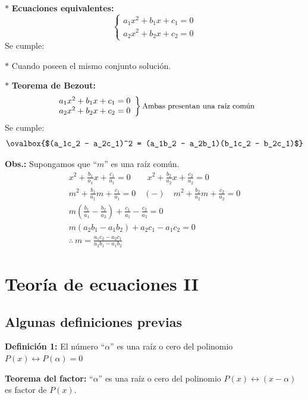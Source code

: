 \documentclass[11pt,a4paper]{article}
\begin{document}
\begin{minipage}[t]{0.436\textwidth}
$\ast$ \textbf{Ecuaciones equivalentes:}
\[
\begin{cases}
a_1x^2 + b_1x + c_1 = 0\\
a_2x^2 + b_2x + c_2 = 0
\end{cases}
\]
Se cumple: \ 

\medskip
$\ast$ Cuando poseen el mismo conjunto solución.
\end{minipage}\hfill
\begin{minipage}[t]{0.533\textwidth}
$\ast$ \textbf{Teorema de Bezout:}
\[
\left.\begin{array}{l}
a_1x^2 + b_1x + c_1 = 0\\
a_2x^2 + b_2x + c_2 = 0
\end{array}\right\}
\text{\small Ambas presentan una raíz común}
\]
Se cumple:
\[\ovalbox{$(a_1c_2 - a_2c_1)^2 = (a_1b_2 - a_2b_1)(b_1c_2 - b_2c_1)$}\]

\textbf{Obs.:} Supongamos que ``$m$'' es una raíz común.
\begin{gather*}
x^2 + \frac{b_1}{a_1}x + \frac{c_1}{a_1} = 0 \qquad x^2 + \frac{b_2}{a_2}x + \frac{c_2}{a_2} = 0\\
m^2 + \frac{b_1}{a_1}m + \frac{c_1}{a_1} = 0 \quad (-) \quad m^2 + \frac{b_2}{a_2}m + \frac{c_2}{a_2} = 0\\
m\left(\frac{b_1}{a_1} - \frac{b_2}{a_2}\right) + \frac{c_1}{a_1} - \frac{c_2}{a_2} = 0\\
m(a_2b_1 - a_1b_2) + a_2c_1 - a_1c_2 = 0\\
\therefore\ m = \frac{a_1c_2 - a_2c_1}{a_2b_1 - a_1b_2}
\end{gather*}
\end{minipage}

\newpage
\section{Teoría de ecuaciones II}

\subsection*{Algunas definiciones previas}

\textbf{Definición 1:} El número ``$\alpha$'' es una raíz o cero del polinomio
$P(x) \longleftrightarrow P(\alpha) = 0$

\textbf{Teorema del factor:} ``$\alpha$'' es una raíz o cero del polinomio
$P(x) \longleftrightarrow (x - \alpha)$ es factor de $P(x)$.
\end{document}
